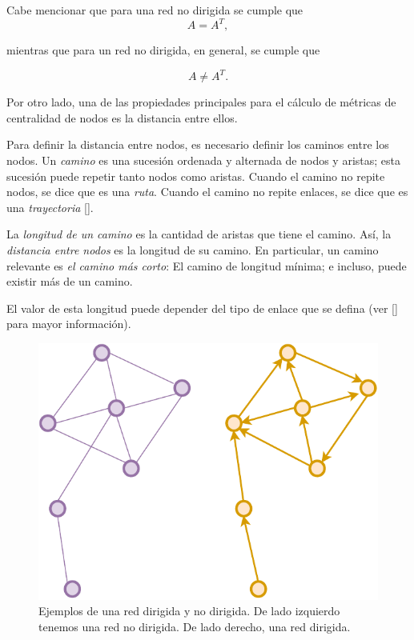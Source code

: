 \documentclass[../main.tex]{subfiles}
\begin{document}
Cabe mencionar que para una red no dirigida se cumple que 
$$A = A^{T},$$

mientras que para un red no dirigida, en general, se cumple que 

$$A \neq A^{T}.$$



Por otro lado, una de las propiedades principales para el cálculo de métricas de centralidad de nodos es la distancia entre ellos.  

Para definir la distancia entre nodos, es necesario definir los caminos entre los nodos. Un \textit{camino} es una sucesión ordenada y alternada de nodos y aristas; esta sucesión puede repetir tanto nodos como aristas. Cuando el camino no repite nodos, se dice que es una \textit{ruta}. Cuando el camino no repite enlaces, se dice que es una \textit{trayectoria} [\cite{bollobás1998modern}]. 



La \textit{longitud de un camino} es la cantidad de aristas que tiene el camino. Así, la \textit{distancia entre nodos} es la longitud de su camino. En particular, un camino relevante es \textit{el camino más corto}: El camino de longitud mínima; e incluso, puede existir más de un camino. 

El valor de esta longitud puede depender del tipo de enlace que se defina (ver [\cite{bondy1976graph}] para mayor información).




\begin{figure}[h!]
    \centering
    \includegraphics[scale = 0.8]{images/marcoteorico_graphdigraph.pdf}
    \caption{Ejemplos de una red dirigida y no dirigida. De lado izquierdo tenemos una red no dirigida. De lado derecho, una red dirigida. }
    \label{fig:marcoteorico_graph_digraph}
\end{figure}
\end{document}
